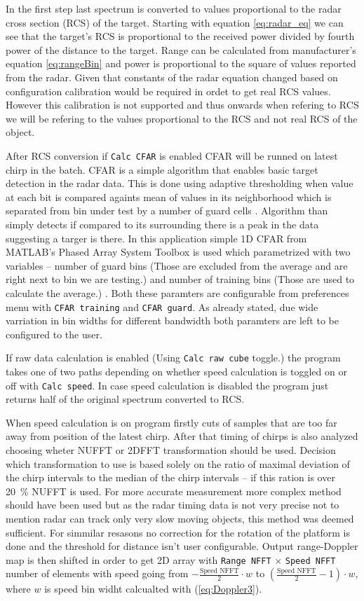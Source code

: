 In the first step last spectrum is converted to values proportional to the radar cross section (RCS) of the target.
Starting with equation \ref{eq:radar_eq} we can see that the target's RCS is proportional to the received power divided by fourth power of the distance to the target.
Range can be calculated from manufacturer's equation \ref{eq:rangeBin} and power is proportional to the square of values reported from the radar.
Given that constants of the radar equation changed based on configuration calibration would be required in ordet to get real RCS values.
However this calibration is not supported and thus onwards when refering to RCS we will be refering to the values proportional to the RCS and not real RCS of the object.

After RCS conversion if \texttt{Calc CFAR} is enabled CFAR will be runned on latest chirp in the batch.
CFAR is a simple algorithm that enables basic target detection in the radar data.
This is done using adaptive thresholding when value at each bit is compared againts mean of values in its neighborhood which is separated from bin under test by a number of guard cells \cite{richards2022}.
Algorithm than simply detects if compared to its surrounding there is a peak in the data suggesting a targer is there.
In this application simple 1D CFAR from MATLAB's Phased Array System Toolbox is used which parametrized with two variables -- number of guard bins (Those are excluded from the average and are right next to bin we are testing.) and number of training bins (Those are used to calculate the average.) \cite{matlab_cfar}.
Both these paramters are configurable from preferences menu with \texttt{CFAR training} and \texttt{CFAR guard}.
As already stated, due wide varriation in bin widths for different bandwidth both paramters are left to be configured to the user.

If raw data calculation is enabled (Using \texttt{Calc raw cube} toggle.) the program takes one of two paths depending on whether speed calculation is toggled on or off with \texttt{Calc speed}.
In case speed calculation is disabled the program just returns half of the original spectrum converted to RCS.

When speed calculation is on program firstly cuts of samples that are too far away from position of the latest chirp.
After that timing of chirps is also analyzed choosing wheter NUFFT or 2DFFT transformation should be used.
Decision which transformation to use is based solely on the ratio of maximal deviation of the chirp intervals to the median of the chirp intervals -- if this ration is over 20~\% NUFFT is used.
For more accurate measurement more complex method should have been used but as the radar timing data is not very precise not to mention radar can track only very slow moving objects, this method was deemed sufficient.
For simmilar resasons no correction for the rotation of the platform is done and the threshold for distance isn't user configurable.
Output range-Doppler map is then shifted in order to get 2D array with \texttt{Range NFFT} $\times$ \texttt{Speed NFFT} number of elements with speed going from $-\frac{\text{Speed NFFT}}{2}\cdot w $ to  $\left(\frac{\text{Speed NFFT}}{2}-1\right)\cdot w $, where $w$ is speed bin widht calcualted with (\ref{eq:Doppler3}).


